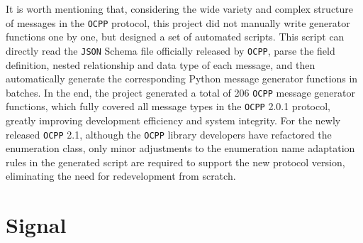 \documentclass[
english,
ruledheaders=section,%
class=report,%
thesis={type=Report},%
accentcolor=9c,%
custommargins=true,%
marginpar=false,%
parskip=half-,%
fontsize=11pt,%
logofile={img/tuda_logo.pdf}, %
]{tudapub}
\begin{document}

    It is worth mentioning that, considering the wide variety and complex structure of messages in the \texttt{OCPP} protocol, this project did not manually write generator functions one by one, but designed a set of automated scripts. This script can directly read the \texttt{JSON} Schema file officially released by \texttt{OCPP}, parse the field definition, nested relationship and data type of each message, and then automatically generate the corresponding Python message generator functions in batches. In the end, the project generated a total of 206 \texttt{OCPP} message generator functions, which fully covered all message types in the \texttt{OCPP} 2.0.1 protocol, greatly improving development efficiency and system integrity. For the newly released \texttt{OCPP} 2.1, although the \texttt{OCPP} library developers have refactored the enumeration class, only minor adjustments to the enumeration name adaptation rules in the generated script are required to support the new protocol version, eliminating the need for redevelopment from scratch.

    \section{Signal}
    \label{sec:signal}
\end{document}
